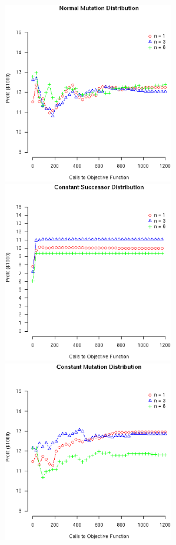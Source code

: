 \documentclass[12pt]{article}
\begin{document}
\begin{figure}[!ht]
\begin{minipage}[b]{0.5\linewidth}
  \end{minipage}
  \begin{minipage}[b]{0.5\linewidth}
    \includegraphics[width=7.5cm]{GenNORMALDist.eps}
  \end{minipage}
  \begin{minipage}[b]{0.5\linewidth}
    \includegraphics[width=7.5cm]{SimCONSTANTDist.eps}
  \end{minipage}
  \begin{minipage}[b]{0.5\linewidth}
    \includegraphics[width=7.5cm]{GenCONSTANTDist.eps}
  \end{minipage}
\end{figure}
\end{document}

